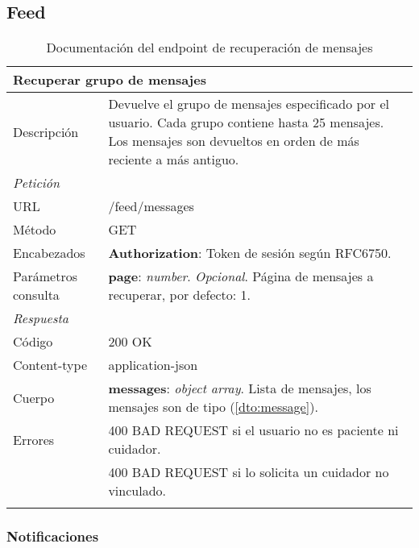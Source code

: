 \subsection{Feed}

\begin{longtable}{|p{} p{}|}
    \hline
    \multicolumn{2}{|l|}{\textbf{Recuperar grupo de mensajes}} \\ \hline 
    Descripción         & Devuelve el grupo de mensajes especificado por el usuario. Cada grupo contiene hasta 25 mensajes. Los mensajes son devueltos en orden de más reciente a más antiguo. \\ \hline \hline
    \multicolumn{2}{|l|}{\emph{Petición}}  \\ \hline 
    URL      & /feed/messages \\ \hline
    Método   & GET                  \\ \hline
    Encabezados  & 
    \textbf{Authorization}: Token de sesión según RFC6750. \\ \hline
    Parámetros consulta  & 
    \textbf{page}: \emph{number}. \emph{Opcional}. Página de mensajes a recuperar, por defecto: 1. \\ \hline \hline
    \multicolumn{2}{|l|}{\emph{Respuesta}} \\ \hline 
    Código          & 200 OK          \\ \hline
    Content-type    & application-json  \\ \hline
    Cuerpo  & 
    \textbf{messages}: \emph{object array}. Lista de mensajes, los mensajes son de tipo \nameref{dto:message} (\ref{dto:message}).
    \\ \hline \hline
    Errores & 400 BAD REQUEST si el usuario no es paciente ni cuidador. \\
        & 400 BAD REQUEST si lo solicita un cuidador no vinculado. \\ \hline
    \caption{Documentación del endpoint de recuperación de mensajes}
    \label{api:recuperar_mensajes}
\end{longtable}

\subsubsection{Notificaciones}

